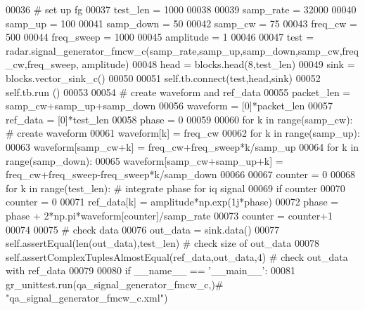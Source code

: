 \begin{DoxyCode}
00036         \textcolor{comment}{# set up fg}
00037         test\_len = 1000
00038         
00039         samp\_rate = 32000
00040         samp\_up = 100
00041         samp\_down = 50
00042         samp\_cw = 75
00043         freq\_cw = 500
00044         freq\_sweep = 1000
00045         amplitude = 1
00046         
00047         test = radar.signal\_generator\_fmcw\_c(samp\_rate,samp\_up,samp\_down,samp\_cw,freq\_cw,freq\_sweep,
      amplitude)
00048         head = blocks.head(8,test\_len)
00049         sink = blocks.vector\_sink\_c()
00050         
00051         self.tb.connect(test,head,sink)
00052         self.tb.run ()
00053         
00054         \textcolor{comment}{# create waveform and ref\_data}
00055         packet\_len = samp\_cw+samp\_up+samp\_down
00056         waveform = [0]*packet\_len
00057         ref\_data = [0]*test\_len
00058         phase = 0
00059         
00060         \textcolor{keywordflow}{for} k \textcolor{keywordflow}{in} range(samp\_cw): \textcolor{comment}{# create waveform}
00061             waveform[k] = freq\_cw
00062         \textcolor{keywordflow}{for} k \textcolor{keywordflow}{in} range(samp\_up):
00063             waveform[samp\_cw+k] = freq\_cw+freq\_sweep*k/samp\_up
00064         \textcolor{keywordflow}{for} k \textcolor{keywordflow}{in} range(samp\_down):
00065             waveform[samp\_cw+samp\_up+k] = freq\_cw+freq\_sweep-freq\_sweep*k/samp\_down
00066         
00067         counter = 0
00068         \textcolor{keywordflow}{for} k \textcolor{keywordflow}{in} range(test\_len): \textcolor{comment}{# integrate phase for iq signal}
00069             \textcolor{keywordflow}{if} counter%
00070                 counter = 0
00071             ref\_data[k] = amplitude*np.exp(1j*phase)
00072             phase = phase + 2*np.pi*waveform[counter]/samp\_rate
00073             counter = counter+1
00074         
00075         \textcolor{comment}{# check data}
00076         out\_data = sink.data()
00077         self.assertEqual(len(out\_data),test\_len) \textcolor{comment}{# check size of out\_data}
00078         self.assertComplexTuplesAlmostEqual(ref\_data,out\_data,4) \textcolor{comment}{# check out\_data with ref\_data}
00079 
00080 \textcolor{keywordflow}{if} \_\_name\_\_ == \textcolor{stringliteral}{'\_\_main\_\_'}:
00081     gr\_unittest.run(qa\_signal\_generator\_fmcw\_c,)\textcolor{comment}{# "qa\_signal\_generator\_fmcw\_c.xml")}
\end{DoxyCode}
